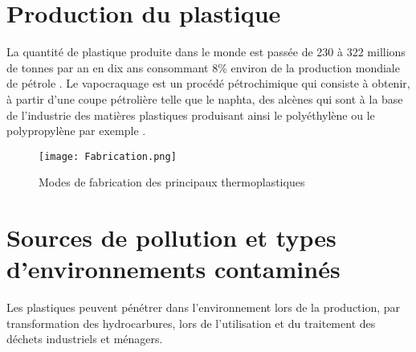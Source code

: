 \section{Production du plastique}
\par{
La  quantit\'e  de  plastique  produite  dans  le  monde  est  pass\'ee de 230 \`a 322 millions de tonnes par an en dix ans {\citep{Plasticseurope}} consommant 8\% environ de la production mondiale de p\'etrole {\citep{Planetoscope}}. Le vapocraquage est un proc\'ed\'e p\'etrochimique qui consiste \`a obtenir, \`a partir d'une coupe p\'etroli\`ere telle que le naphta, des alc\`enes qui sont \`a la base de l'industrie des mati\`eres plastiques produisant ainsi le poly\'ethyl\`ene ou le polypropyl\`ene par exemple {\citep{Europetrole}}.
}

\begin{figure}[h]
\centering
\texttt{[image: Fabrication.png]}
\caption{Modes de fabrication des principaux thermoplastiques {\citep{SCF}}} 
\label{fabrication}
\end{figure}
\FloatBarrier

\section{Sources de pollution et types d'environnements contamin\'es}
\par{
Les plastiques peuvent p\'en\'etrer dans l'environnement lors de la production, par transformation des hydrocarbures, lors de l'utilisation et du traitement des d\'echets industriels et m\'enagers.
}

